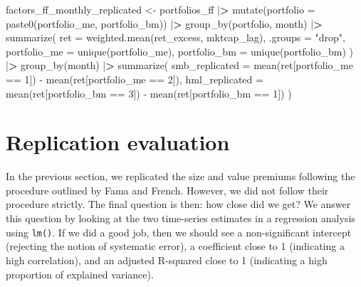 \documentclass[
]{book}
\newenvironment{Shaded}{\begin{snugshade}}{\end{snugshade}}
\newcommand{\AttributeTok}[1]{\textcolor[rgb]{0.61,0.61,0.61}{#1}}
\newcommand{\DecValTok}[1]{\textcolor[rgb]{0.06,0.06,0.06}{#1}}
\newcommand{\ErrorTok}[1]{\textcolor[rgb]{0.14,0.14,0.14}{\textbf{#1}}}
\newcommand{\FunctionTok}[1]{\textcolor[rgb]{0,0,0}{#1}}
\newcommand{\NormalTok}[1]{#1}
\newcommand{\OtherTok}[1]{\textcolor[rgb]{0.37,0.37,0.37}{#1}}
\newcommand{\SpecialCharTok}[1]{\textcolor[rgb]{0,0,0}{#1}}
\newcommand{\StringTok}[1]{\textcolor[rgb]{0.5,0.5,0.5}{#1}}
\begin{document}
\begin{Shaded}
\begin{Highlighting}[]
\NormalTok{factors\_ff\_monthly\_replicated }\OtherTok{\textless{}{-}}\NormalTok{ portfolios\_ff }\SpecialCharTok{|}\ErrorTok{\textgreater{}}
  \FunctionTok{mutate}\NormalTok{(}\AttributeTok{portfolio =} \FunctionTok{paste0}\NormalTok{(portfolio\_me, portfolio\_bm)) }\SpecialCharTok{|}\ErrorTok{\textgreater{}}
  \FunctionTok{group\_by}\NormalTok{(portfolio, month) }\SpecialCharTok{|}\ErrorTok{\textgreater{}}
  \FunctionTok{summarize}\NormalTok{(}
    \AttributeTok{ret =} \FunctionTok{weighted.mean}\NormalTok{(ret\_excess, mktcap\_lag), }\AttributeTok{.groups =} \StringTok{"drop"}\NormalTok{,}
    \AttributeTok{portfolio\_me =} \FunctionTok{unique}\NormalTok{(portfolio\_me),}
    \AttributeTok{portfolio\_bm =} \FunctionTok{unique}\NormalTok{(portfolio\_bm)}
\NormalTok{  ) }\SpecialCharTok{|}\ErrorTok{\textgreater{}}
  \FunctionTok{group\_by}\NormalTok{(month) }\SpecialCharTok{|}\ErrorTok{\textgreater{}}
  \FunctionTok{summarize}\NormalTok{(}
    \AttributeTok{smb\_replicated =} \FunctionTok{mean}\NormalTok{(ret[portfolio\_me }\SpecialCharTok{==} \DecValTok{1}\NormalTok{]) }\SpecialCharTok{{-}} 
      \FunctionTok{mean}\NormalTok{(ret[portfolio\_me }\SpecialCharTok{==} \DecValTok{2}\NormalTok{]),}
    \AttributeTok{hml\_replicated =} \FunctionTok{mean}\NormalTok{(ret[portfolio\_bm }\SpecialCharTok{==} \DecValTok{3}\NormalTok{]) }\SpecialCharTok{{-}} 
      \FunctionTok{mean}\NormalTok{(ret[portfolio\_bm }\SpecialCharTok{==} \DecValTok{1}\NormalTok{])}
\NormalTok{  )}
\end{Highlighting}
\end{Shaded}

\hypertarget{replication-evaluation}{%
\section{Replication evaluation}\label{replication-evaluation}}

In the previous section, we replicated the size and value premiums following the procedure outlined by Fama and French. However, we did not follow their procedure strictly. The final question is then: how close did we get? We answer this question by looking at the two time-series estimates in a regression analysis using \texttt{lm()}. If we did a good job, then we should see a non-significant intercept (rejecting the notion of systematic error), a coefficient close to 1 (indicating a high correlation), and an adjusted R-squared close to 1 (indicating a high proportion of explained variance).
\end{document}
